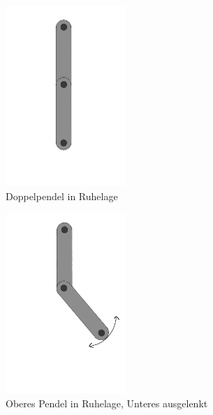 \documentclass[11pt,a4paper,titlepage, ngerman]{article}
\begin{document}
			\begin{figure}[ht]
				\begin{subfigure}{0.5\textwidth}
					\centering
					\includegraphics[width=0.5\textwidth]{Doppelpendel_Ruhelage.png}
					\caption{Doppelpendel in Ruhelage}
					\label{abb:DP_Ruhe}	
				\end{subfigure}
				\begin{subfigure}{0.5\textwidth}
					\centering
					\includegraphics[width=0.5\textwidth]{Doppelpendel_Auslenkung_P2.png}
					\caption{Oberes Pendel in Ruhelage, Unteres ausgelenkt}
					\label{abb:DP_RobenAunten}
				\end{subfigure}
				\begin{subfigure}{0.5\textwidth}

\end{subfigure}
\end{figure}
\end{document}

